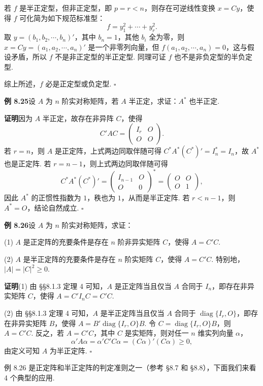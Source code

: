 \documentclass[UTF8,12pt,a4paper,fontset=fandol]{ctexart}
\begin{document}
若 $f$ 是半正定型，但非正定型，即 $p=r<n$，则存在可逆线性变换 $x=Cy$，使得 $f$ 可化简为如下规范标准型：
\[
f=y_1^2+\cdots+y_r^2.
\]
取 $y=(b_1,b_2,\cdots,b_n)'$，其中 $b_n=1$，其他 $b_i$ 全为零，则 $x=Cy=(a_1,a_2,\cdots,a_n)'$ 是一个非零列向量，但 $f(a_1,a_2,\cdots,a_n)=0$，这与假设矛盾，所以 $f$ 不是非正定型的半正定型. 同理可证 $f$ 也不是非负定型的半负定型.

综上所述，$f$ 必是正定型或负定型. $\ensuremath{\square}$

\noindent\textbf{例 8.25}\quad 设 $A$ 为 $n$ 阶实对称矩阵，若 $A$ 半正定，求证：$A^*$ 也半正定.

\noindent\textbf{证明}\quad 因为 $A$ 半正定，故存在非异阵 $C$，使得
\[
C'AC=\left(\begin{array}{cc}
I_r & O\\
O & O
\end{array}\right).
\]
若 $r=n$，则 $A$ 是正定阵，上式两边同取伴随可得 $C^*A^*(C^*)'=I_n^*=I_n$，故 $A^*$ 也是正定阵. 若 $r=n-1$，则上式两边同取伴随可得
\[
C^*A^*(C^*)'=
\left(\begin{array}{cc}
I_{n-1} & O\\
O & 0
\end{array}\right)^*
=
\left(\begin{array}{cc}
O & O\\
O & 1
\end{array}\right),
\]
因此 $A^*$ 的正惯性指数为 $1$，秩也为 $1$，从而是半正定阵. 若 $r<n-1$，则 $A^*=O$，结论自然成立. $\ensuremath{\square}$

\noindent\textbf{例 8.26}\quad 设 $A$ 为 $n$ 阶实对称矩阵，求证：

(1) $A$ 是正定阵的充要条件是存在 $n$ 阶非异实矩阵 $C$，使得 $A=C'C$.

(2) $A$ 是半正定阵的充要条件是存在 $n$ 阶实矩阵 $C$，使得 $A=C'C$. 特别地，$|A|=|C|^2\ge 0$.

\noindent\textbf{证明}\quad (1) 由 §§8.1.3 定理 4 可知，$A$ 是正定阵当且仅当 $A$ 合同于 $I_n$，即存在非异实矩阵 $C$，使得 $A=C'I_nC=C'C$.

(2) 由 §§8.1.3 定理 4 可知，$A$ 是半正定阵当且仅当 $A$ 合同于 $\operatorname{diag}\{I_r,O\}$，即存在非异实矩阵 $B$，使得 $A=B'\operatorname{diag}\{I_r,O\}B$. 令 $C=\operatorname{diag}\{I_r,O\}B$，则 $A=C'C$. 反之，若 $A=C'C$，其中 $C$ 是实矩阵，则对任一 $n$ 维实列向量 $\alpha$，
\[
\alpha'A\alpha=\alpha'C'C\alpha=(C\alpha)'(C\alpha)\ge 0,
\]
由定义可知 $A$ 为半正定阵. $\ensuremath{\square}$

例 8.26 是正定阵和半正定阵的判定准则之一（参考 §8.7 和 §8.8），下面我们来看 4 个典型的应用.
\end{document}
